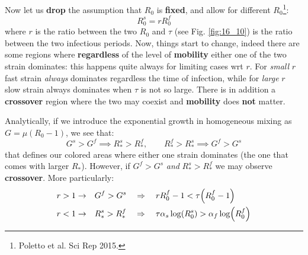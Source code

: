 \documentclass[../main/main.tex]{subfiles}
\begin{document}
Now let us \textbf{drop} the assumption that $R_0$ is \textbf{fixed}, and allow for different $R_0$\footnote{Poletto et al. Sci Rep 2015.}:
\begin{equation}
    R_0 ^ s = r R_0^f
\end{equation}
where $r$ is the ratio between the two $R_0$ and $\tau$ (see Fig. \ref{fig:16_10}) is the ratio between the two infectious periods.
Now, things start to change, indeed there are some regions where \textbf{regardless} of the level of \textbf{mobility} either one of the two strain dominates: this happens quite always for limiting cases wrt $r$. For \textit{small} $r$ fast strain \textit{always} dominates regardless the time of infection, while for \textit{large} $r$ slow strain always dominates when $\tau$ is not so large. There is in addition a \textbf{crossover} region where the two may coexist and \textbf{mobility} does \textbf{not} matter.

Analytically, if we introduce the exponential growth in homogeneous mixing as $G=\mu(R_0 -1)$, we see that:
\begin{equation}
    G^s > G^f \implies R_*^s > R_*^f, \qquad R_*^f > R_*^s \implies G^f > G^s
\end{equation}
that defines our colored areas where either one strain dominates (the one that comes with larger $R_*$). However, if $G^f > G^s$ \textit{and} $R_*^s > R_*^f$ we may observe \textbf{crossover}.
More particularly:
\begin{subequations}
\begin{align*}
  r>1 \rightarrow \quad & G^f > G^s \quad \Rightarrow \quad r R_0^f - 1 < \tau \qty(R_0^f-1) \\
  r<1 \rightarrow \quad & R_*^s > R_*^f \quad \Rightarrow  \quad  \tau  \alpha _s \log (R_0^s) > \alpha _f \log (R_0^f)
\end{align*}
\end{subequations}
\end{document}
